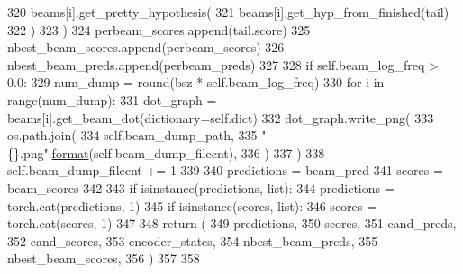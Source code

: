 \begin{DoxyCode}
320                             beams[i].get\_pretty\_hypothesis(
321                                 beams[i].get\_hyp\_from\_finished(tail)
322                             )
323                         )
324                         perbeam\_scores.append(tail.score)
325                     nbest\_beam\_scores.append(perbeam\_scores)
326                     nbest\_beam\_preds.append(perbeam\_preds)
327 
328                 \textcolor{keywordflow}{if} self.beam\_log\_freq > 0.0:
329                     num\_dump = round(bsz * self.beam\_log\_freq)
330                     \textcolor{keywordflow}{for} i \textcolor{keywordflow}{in} range(num\_dump):
331                         dot\_graph = beams[i].get\_beam\_dot(dictionary=self.dict)
332                         dot\_graph.write\_png(
333                             os.path.join(
334                                 self.beam\_dump\_path,
335                                 \textcolor{stringliteral}{"\{\}.png"}.\hyperlink{namespaceparlai_1_1chat__service_1_1services_1_1messenger_1_1shared__utils_a32e2e2022b824fbaf80c747160b52a76}{format}(self.beam\_dump\_filecnt),
336                             )
337                         )
338                         self.beam\_dump\_filecnt += 1
339 
340                 predictions = beam\_pred
341                 scores = beam\_scores
342 
343         \textcolor{keywordflow}{if} isinstance(predictions, list):
344             predictions = torch.cat(predictions, 1)
345         \textcolor{keywordflow}{if} isinstance(scores, list):
346             scores = torch.cat(scores, 1)
347 
348         \textcolor{keywordflow}{return} (
349             predictions,
350             scores,
351             cand\_preds,
352             cand\_scores,
353             encoder\_states,
354             nbest\_beam\_preds,
355             nbest\_beam\_scores,
356         )
357 
358 
\end{DoxyCode}
\mbox{\label{classparlai_1_1agents_1_1legacy__agents_1_1seq2seq_1_1modules__v0_1_1Seq2seq_a0c0270e1e4c3f72bca49d3752d90baab}} 
